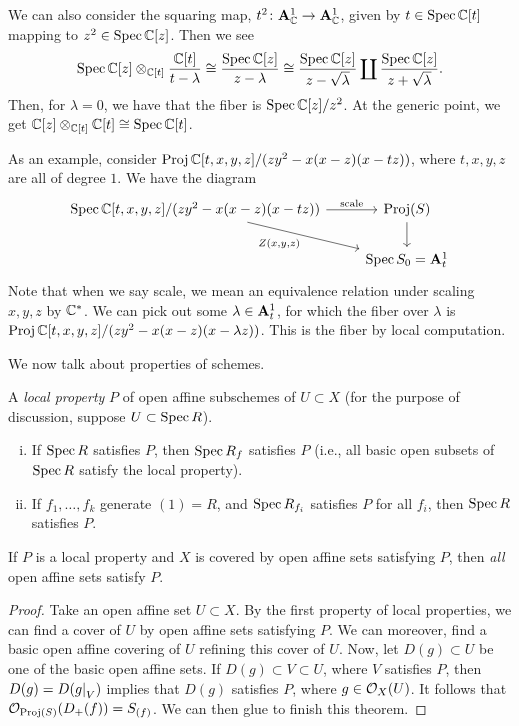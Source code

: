 We can also consider the squaring map, $t^2 \colon \mathbf A_\mathbb C^1 \to \mathbf A_\mathbb C^1$, given by $t \in \operatorname{Spec} \mathbb C[t]$ mapping to $z^2 \in \operatorname{Spec} \mathbb C[z]$. Then we see
\[ \operatorname{Spec} \mathbb C[z] \otimes_{\mathbb C[t]} \frac{\mathbb C[t]}{t - \lambda} \cong \frac{\operatorname{Spec} \mathbb C[z]}{z - \lambda} \cong \frac{\operatorname{Spec} \mathbb C[z]}{z - \sqrt{\lambda}} \coprod \frac{\operatorname{Spec} \mathbb C[z]}{z + \sqrt{\lambda}}. \]
Then, for $\lambda = 0$, we have that the fiber is $\operatorname{Spec} \mathbb C[z]/z^2$. At the generic point, we get $\mathbb C[z] \otimes_{\mathbb C[t]} \mathbb C[t] \cong \operatorname{Spec} \mathbb C[t]$.

\newpage
As an example, consider $\operatorname{Proj} \mathbb C[t, x, y, z] / (zy^2 - x(x - z)(x - tz))$, where $t, x, y, z$ are all of degree $1$. We have the diagram
\[ \begin{tikzcd}
    \Spec \CC[t, x, y, z] / (zy^2 - x(x - z)(x - tz)) \arrow[r, "\text{scale}"] \arrow[rd, "{Z(x, y, z)}"'] & \opname{Proj}(S) \arrow[d] \\ & \Spec S_0 = \mbf A_t^1
\end{tikzcd} \]
Note that when we say scale, we mean an equivalence relation under scaling $x, y, z$ by $\mathbb C^\ast$. We can pick out some $\lambda \in \mathbf A_t^1$, for which the fiber over $\lambda$ is $\operatorname{Proj} \mathbb C[t, x, y, z]/(zy^2 - x(x-z)(x-\lambda z))$. This is the fiber by local computation.

We now talk about properties of schemes.

\begin{definition} \label{defn:local_property}
    A \textit{local property} $P$ of open affine subschemes of $U \subset X$ (for the purpose of discussion, suppose $U \subset \operatorname{Spec} R$).
    \begin{enumerate}[(i)]
        \item If $\operatorname{Spec} R$ satisfies $P$, then $\operatorname{Spec} R_f$ satisfies $P$ (i.e., all basic open subsets of $\operatorname{Spec} R$ satisfy the local property).
        \item If $f_1, \dots, f_k$ generate $(1) = R$, and $\operatorname{Spec} R_{f_i}$ satisfies $P$ for all $f_i$, then $\operatorname{Spec} R$ satisfies $P$.
    \end{enumerate} 
\end{definition}

\begin{theorem} \label{thm:affine_communication_lemma}
    If $P$ is a local property and $X$ is covered by open affine sets satisfying $P$, then \textit{all} open affine sets satisfy $P$.
\end{theorem}
\begin{proof}
    Take an open affine set $U \subset X$. By the first property of local properties, we can find a cover of $U$ by open affine sets satisfying $P$. We can moreover, find a basic open affine covering of $U$ refining this cover of $U$. Now, let $D(g) \subset U$ be one of the basic open affine sets. If $D(g) \subset V \subset U$, where $V$ satisfies $P$, then $D(g) = D(\restr{g}{V})$ implies that $D(g)$ satisfies $P$, where $g \in \mathcal O_X(U)$. It follows that $\mathcal O_{\operatorname{Proj}(S)}(D_+(f)) = S_{(f)}$. We can then glue to finish this theorem.
\end{proof}
